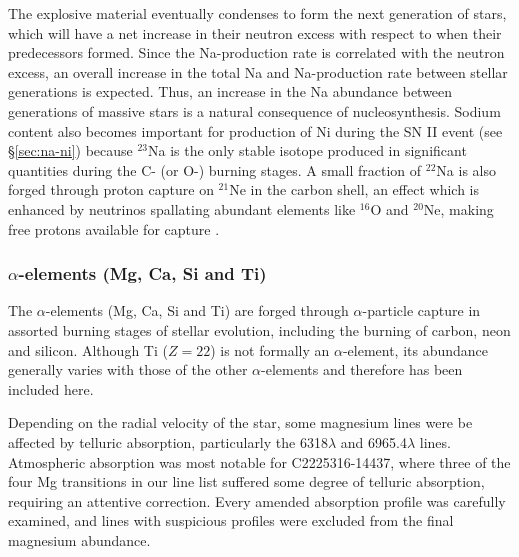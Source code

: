 \documentclass{emulateapj}
\begin{document}
The explosive material eventually condenses to form the next generation of stars, which will have a net increase in their neutron excess with respect to when their predecessors formed. Since the Na-production rate is correlated with the neutron excess, an overall increase in the total Na and Na-production rate between stellar generations is expected. Thus, an increase in the Na abundance between generations of massive stars is a natural consequence of nucleosynthesis. Sodium content also becomes important for production of Ni during the SN II event (see \S\ref{sec:na-ni}) because $^{23}$Na is the only stable isotope produced in significant quantities during the C- (or O-) burning stages. A small fraction of $^{22}$Na is also forged through proton capture on $^{21}$Ne in the carbon shell, an effect which is enhanced by neutrinos spallating abundant elements like $^{16}$O and $^{20}$Ne, making free protons available for capture \citep{woosley;weaver_1995}.


\subsubsection{$\alpha$-elements (Mg, Ca, Si and Ti)}
\label{sec:alpha-elements}

The $\alpha$-elements (Mg, Ca, Si and Ti) are forged through $\alpha$-particle capture in assorted burning stages of stellar evolution, including the burning of carbon, neon and silicon. Although Ti ($Z = 22$) is not formally an $\alpha$-element, its abundance generally varies with those of the other $\alpha$-elements and therefore has been included here.

Depending on the radial velocity of the star, some magnesium lines were be affected by telluric absorption, particularly the 6318$\lambda$ and 6965.4$\lambda$ lines. Atmospheric absorption was most notable for C2225316-14437, where three of the four Mg transitions in our line list suffered some degree of telluric absorption, requiring an attentive correction. Every amended absorption profile was carefully examined, and lines with suspicious profiles were excluded from the final magnesium abundance.
\end{document}
